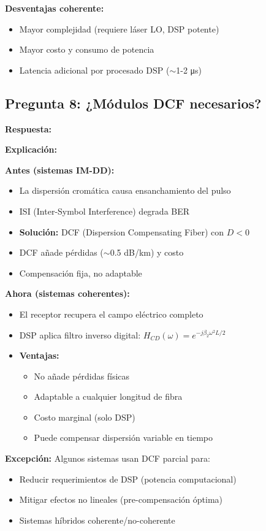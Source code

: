 \documentclass[a4paper,10pt]{article}
\begin{document}
\textbf{Desventajas coherente:}
\begin{itemize}
    \item Mayor complejidad (requiere láser LO, DSP potente)
    \item Mayor costo y consumo de potencia
    \item Latencia adicional por procesado DSP ($\sim$1-2 μs)
\end{itemize}

\subsection{Pregunta 8: ¿Módulos DCF necesarios?}

\textbf{Respuesta:} 

\textbf{Explicación:}

\textbf{Antes (sistemas IM-DD):}
\begin{itemize}
    \item La dispersión cromática causa ensanchamiento del pulso
    \item ISI (Inter-Symbol Interference) degrada BER
    \item \textbf{Solución:} DCF (Dispersion Compensating Fiber) con $D < 0$
    \item DCF añade pérdidas ($\sim$0.5 dB/km) y costo
    \item Compensación fija, no adaptable
\end{itemize}

\textbf{Ahora (sistemas coherentes):}
\begin{itemize}
    \item El receptor recupera el campo eléctrico completo
    \item DSP aplica filtro inverso digital: $H_{CD}(\omega) = e^{-j\beta_2 \omega^2 L / 2}$
    \item \textbf{Ventajas:}
    \begin{itemize}
        \item No añade pérdidas físicas
        \item Adaptable a cualquier longitud de fibra
        \item Costo marginal (solo DSP)
        \item Puede compensar dispersión variable en tiempo
    \end{itemize}
\end{itemize}

\textbf{Excepción:} Algunos sistemas usan DCF parcial para:
\begin{itemize}
    \item Reducir requerimientos de DSP (potencia computacional)
    \item Mitigar efectos no lineales (pre-compensación óptima)
    \item Sistemas híbridos coherente/no-coherente
\end{itemize}
\end{document}
